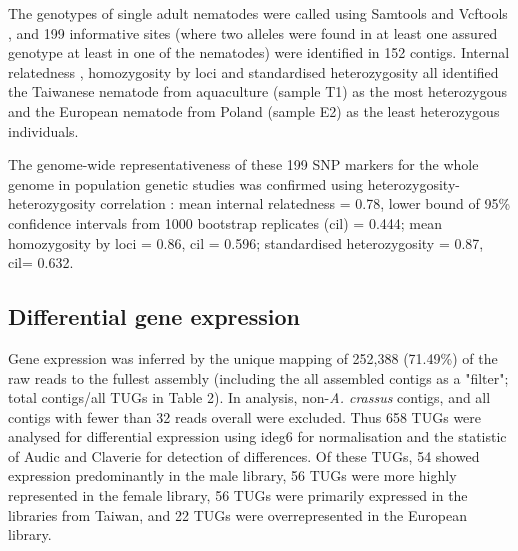 \documentclass[10pt]{bmc_article}
\newenvironment{bmcformat}{\begin{raggedright}\baselineskip20pt\sloppy\setboolean{publ}{false}}{\end{raggedright}\baselineskip20pt\sloppy}
\begin{document}
\begin{bmcformat}
The genotypes of single adult nematodes were called using Samtools
\cite{journals/bioinformatics/LiHWFRHMAD09} and Vcftools
\cite{pmid21653522}, and 199 informative sites (where
two alleles were found in at least one assured genotype at least in
one of the nematodes) were identified in 152
contigs. Internal relatedness \cite{pmid11571049}, homozygosity by
loci \cite{pmid17107491} and standardised heterozygosity
\cite{coltman81j} all identified the Taiwanese nematode from
aquaculture (sample T1) as the most heterozygous and the European
nematode from Poland (sample E2) as the least heterozygous
individuals.

The genome-wide representativeness of these 199 SNP
markers for the whole genome in population genetic studies was
confirmed using heterozygosity-heterozygosity correlation
\cite{pmid21565077}: mean internal relatedness = 0.78, lower bound of
95\% confidence intervals from 1000 bootstrap replicates (cil) =
0.444; mean homozygosity by loci = 0.86, cil = 0.596; standardised
heterozygosity = 0.87, cil= 0.632.

 \subsection*{Differential gene expression}
                





Gene expression was inferred by the unique mapping of 252,388
(71.49\%) of the raw reads to the fullest assembly (including the all
assembled contigs as a "filter"; total contigs/all TUGs in Table
2). In analysis, non-\textit{A. crassus} contigs, and all contigs with
fewer than 32 reads overall were excluded. Thus
658 TUGs were analysed for differential expression
using ideg6 for normalisation and the statistic of Audic and Claverie
\cite{pmid9331369} for detection of differences. Of these TUGs, 54
showed expression predominantly in the male library, 56 TUGs were more
highly represented in the female library, 56 TUGs were primarily
expressed in the libraries from Taiwan, and 22 TUGs were
overrepresented in the European library.


\end{bmcformat}
\end{document}
